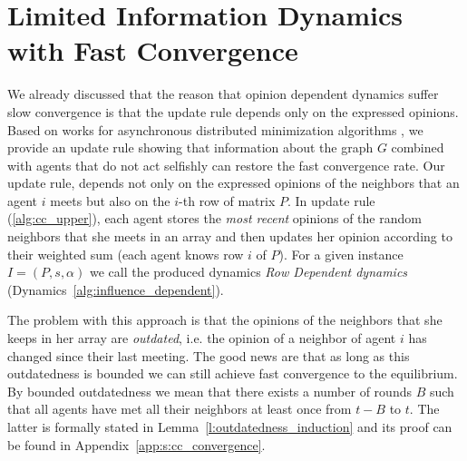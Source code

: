 \section{Limited Information Dynamics with Fast Convergence}\label{s:cc_convergence}

We already discussed that the reason that opinion dependent dynamics suffer slow
convergence is that the update rule depends only on the expressed opinions.
Based on works for asynchronous distributed minimization algorithms \cite{BT97,CC16},
we provide an update rule showing that information about the
graph $G$ combined with agents that do not act selfishly can restore the
fast convergence rate.
Our update rule, depends not only on the expressed opinions of the
neighbors that an agent $i$ meets but also on the $i$-th row of matrix $P$.
In update rule (\ref{alg:cc_upper}), each agent stores the
\emph{most recent} opinions of the random neighbors that she meets in an array
and then updates her opinion according to their weighted sum
(each agent knows row $i$ of $P$). For a given instance
$I=(P,s,\alpha)$ we call the produced dynamics \emph{Row Dependent dynamics}
(Dynamics~\ref{alg:influence_dependent}).

The problem with this approach is that the opinions of the neighbors
that she keeps in her array are \emph{outdated}, i.e. the opinion of
a neighbor of agent $i$ has changed since their last meeting.
The good news are that as long as this outdatedness
is bounded we can still achieve fast convergence to the
equilibrium.  By bounded outdatedness we mean that there exists a
number of rounds $B$ such that all agents have met all their neighbors
at least once from $t-B$ to $t$.  The latter is formally stated in
Lemma~\ref{l:outdatedness_induction} and its proof can be found in
Appendix~\ref{app:s:cc_convergence}.

